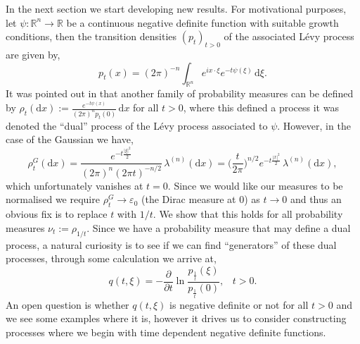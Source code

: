 \documentclass[a4paper, 12pt]{report}
\theoremstyle{remark}
\theoremstyle{definition}
\begin{document}
In the next section we start developing new results.  For motivational purposes, let $\psi : \mathbb{R}^n \to \mathbb{R}$ be a continuous negative definite function with suitable growth conditions, then the transition densities $(p_t)_{t > 0}$ of the associated L\'evy process are given by,
$$
p_t(x) = (2\pi)^{-n}\int_{\mathbb{R}^n}e^{ix\cdot\xi}e^{-t\psi(\xi)}\,\mathrm{d}\xi.
$$
It was pointed out in \cite{Paper} that another family of probability measures can be defined by $\rho_t(\mathrm{d}x) := \frac{e^{-t\psi(x)}}{(2\pi)^np_t(0)}\,\mathrm{d}x$ for all $t > 0$, where this defined a process it was denoted the ``dual'' process of the L\'evy process associated to $\psi$.  However, in the case of the Gaussian we have,
$$
\rho_t^G(\mathrm{d}x) = \frac{e^{-t\frac{|\xi|^2}{2}}}{(2\pi)^n(2\pi t)^{-n/2}}\,\lambda^{(n)}(\mathrm{d}x) = \bigg(\frac{t}{2\pi}\bigg)^{n/2}e^{-t\frac{|x|^2}{2}}\,\lambda^{(n)}(\mathrm{d}x),
$$
which unfortunately vanishes at $t = 0$.  Since we would like our measures to be normalised we require $\rho_t^G \to \varepsilon_0$ (the Dirac measure at $0$) as $t \to 0$ and thus an obvious fix is to replace $t$ with $1/t$.  We show that this holds for all probability measures $\nu_t := \rho_{1/t}$.  Since we have a probability measure that may define a dual process, a natural curiosity is to see if we can find ``generators'' of these dual processes, through some calculation we arrive at,
$$
q(t, \xi) = -\frac{\partial}{\partial t}\ln\frac{p_\frac{1}{t}(\xi)}{p_\frac{1}{t}(0)}, \,\,\,\,\, t > 0.
$$
An open question is whether $q(t, \xi)$ is negative definite or not for all $t > 0$ and we see some examples where it is, however it drives us to consider constructing processes where we begin with time dependent negative definite functions.
\end{document}
